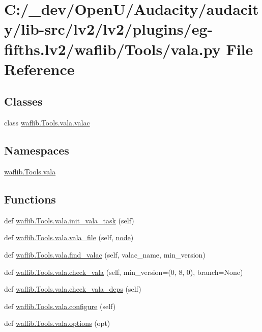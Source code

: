 \hypertarget{lv2_2plugins_2eg-fifths_8lv2_2waflib_2_tools_2vala_8py}{}\section{C\+:/\+\_\+dev/\+Open\+U/\+Audacity/audacity/lib-\/src/lv2/lv2/plugins/eg-\/fifths.lv2/waflib/\+Tools/vala.py File Reference}
\label{lv2_2plugins_2eg-fifths_8lv2_2waflib_2_tools_2vala_8py}
\subsection*{Classes}
\begin{DoxyCompactItemize}
\item 
class \hyperlink{classwaflib_1_1_tools_1_1vala_1_1valac}{waflib.\+Tools.\+vala.\+valac}
\end{DoxyCompactItemize}
\subsection*{Namespaces}
\begin{DoxyCompactItemize}
\item 
 \hyperlink{namespacewaflib_1_1_tools_1_1vala}{waflib.\+Tools.\+vala}
\end{DoxyCompactItemize}
\subsection*{Functions}
\begin{DoxyCompactItemize}
\item 
def \hyperlink{namespacewaflib_1_1_tools_1_1vala_afedcf657dff8a988abdf3f52dc1b1584}{waflib.\+Tools.\+vala.\+init\+\_\+vala\+\_\+task} (self)
\item 
def \hyperlink{namespacewaflib_1_1_tools_1_1vala_a6baf611b698503ed4c43e8ff2e870acd}{waflib.\+Tools.\+vala.\+vala\+\_\+file} (self, \hyperlink{structnode}{node})
\item 
def \hyperlink{namespacewaflib_1_1_tools_1_1vala_afcb54ec67c0f38a26b8cf34ae9c89b7b}{waflib.\+Tools.\+vala.\+find\+\_\+valac} (self, valac\+\_\+name, min\+\_\+version)
\item 
def \hyperlink{namespacewaflib_1_1_tools_1_1vala_a3093897181665808445ee213a19a6d64}{waflib.\+Tools.\+vala.\+check\+\_\+vala} (self, min\+\_\+version=(0, 8, 0), branch=None)
\item 
def \hyperlink{namespacewaflib_1_1_tools_1_1vala_a0e50168b039627d93b07929537af57af}{waflib.\+Tools.\+vala.\+check\+\_\+vala\+\_\+deps} (self)
\item 
def \hyperlink{namespacewaflib_1_1_tools_1_1vala_aa13ac0bb84782b53e5cf4761adb55657}{waflib.\+Tools.\+vala.\+configure} (self)
\item 
def \hyperlink{namespacewaflib_1_1_tools_1_1vala_a17771e1da92206049384a4fea5523b78}{waflib.\+Tools.\+vala.\+options} (opt)
\end{DoxyCompactItemize}
